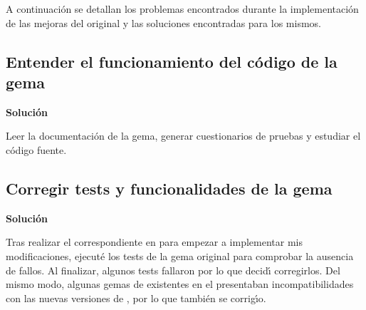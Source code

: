 A continuaci\'on se detallan los problemas encontrados durante la implementaci\'on de las mejoras del  original y las soluciones
encontradas para los mismos.

\subsection{Entender el funcionamiento del c\'odigo de la gema}
\label{subsec:3.1.1}
\bigskip

{\normalsize {\bfseries Soluci\'on}}
\bigskip

Leer la documentaci\'on de la gema, generar cuestionarios de pruebas y estudiar el c\'odigo fuente.

\subsection{Corregir tests y funcionalidades de la gema}
\label{subsec:3.1.2}
\bigskip

{\normalsize {\bfseries Soluci\'on}}
\bigskip

Tras realizar el correspondiente  en  para empezar a implementar mis modificaciones, ejecut\'e los tests de la 
gema original para comprobar la ausencia de fallos. Al finalizar, algunos tests fallaron por lo que decid\'{\i} corregirlos. Del 
mismo modo, algunas gemas de  existentes en el  presentaban incompatibilidades con las nuevas versiones de , por
lo que tambi\'en se corrig\'{\i}o.
\bigskip
